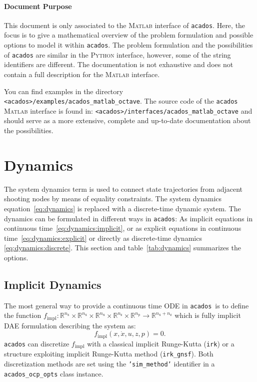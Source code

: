 \documentclass[english]{article}
\newcommand{\code}[1]{\texttt{#1}}
\newcommand{\acados}{\texttt{acados}}
\newcommand{\matlab}{\textsc{Matlab}}
\newcommand{\python}{\textsc{Python}}
\newcommand{\ind}[1]{_{\textrm{#1}}}
\newcommand{\nx}{n\ind{x}}
\newcommand{\nuu}{n\ind{u}}
\newcommand{\nz}{n\ind{z}}
\newcommand{\np}{n\ind{p}}
\begin{document}
\paragraph{Document Purpose}
This document is only associated to the \matlab{} interface of \acados.
Here, the focus is to give a mathematical overview of the problem formulation and possible options to model it within \acados.
The problem formulation and the possibilities of \acados{} are similar in the \python{} interface, however, some of the string identifiers are different.
The documentation is not exhaustive and does not contain a full description for the \matlab{} interface.

You can find examples in the directory \code{<acados>/examples/acados\_matlab\_octave}.
The source code of the \acados{} \matlab{} interface is found in: \code{<acados>/interfaces/acados\_matlab\_octave} and should serve as a more extensive, complete and up-to-date documentation about the possibilities.
%
\section{Dynamics}\label{sec:dynamics}
%
The system dynamics term is used to connect state trajectories from adjacent shooting nodes by means of equality constraints.
%
The system dynamics equation~\eqref{eq:dynamics} is replaced with a discrete-time dynamic system.
The dynamics can be formulated in different ways in \acados:
As implicit equations in continuous time~\eqref{eq:dynamics:implicit}, or as explicit equations in continuous time~\eqref{eq:dynamics:explicit} or directly as discrete-time dynamics \eqref{eq:dynamics:discrete}.
This section and table~\ref{tab:dynamics} summarizes the options.
%
\subsection{Implicit Dynamics}\label{sec:dynamics:implicit}
%
The most general way to provide a continuous time ODE in \acados\ is to define the function $ f\ind{impl}: \mathbb{R}^{\nx}\times\mathbb{R}^{\nx}\times\mathbb{R}^{\nuu}\times\mathbb{R}^{\nz}\times\mathbb{R}^{\np} \rightarrow \mathbb{R}^{\nx+\nz}$ which is fully implicit DAE formulation describing the system as:
\begin{equation}
    f\ind{impl}(x, \dot{x}, u, z, p) = 0.\label{eq:dynamics:implicit}
\end{equation}
\acados{} can discretize $ f\ind{impl} $ with a classical implicit Runge-Kutta (\code{irk}) or a structure exploiting implicit Runge-Kutta method (\code{irk\_gnsf}). Both discretization methods are set using the \code{'sim\_method'} identifier in a \code{acados\_ocp\_opts} class instance.
%
\end{document}
